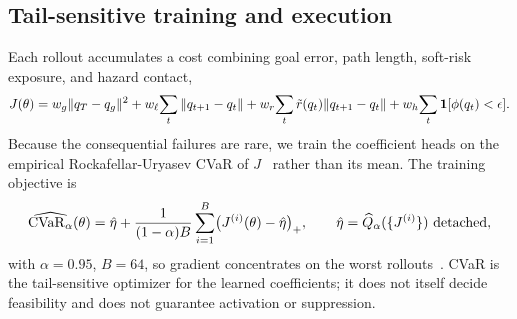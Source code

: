 
\subsection{Tail-sensitive training and execution}
\label{sec:method:cvar}

Each rollout accumulates a cost combining goal error, path length, soft-risk exposure, and hazard contact,
\begin{equation}
J(\theta) =
w_g\|q_T-q_g\|^2
+ w_\ell\!\sum_t\|q_{t+1}-q_t\|
+ w_r\!\sum_t\tilde r(q_t)\|q_{t+1}-q_t\|
+ w_h\!\sum_t\mathbf{1}[\phi(q_t)<\epsilon].
\label{eq:method:J}
\end{equation}
Because the consequential failures are rare, we train the coefficient heads on the empirical Rockafellar-Uryasev CVaR of $J$~\citep{rockafellar2000optimization} rather than its mean. The training objective is
\begin{equation}
\widehat{\mathrm{CVaR}_{\alpha}}(\theta)
=
\hat\eta
+\frac{1}{(1-\alpha)B}\sum_{i=1}^{B}\bigl(J^{(i)}(\theta)-\hat\eta\bigr)_+,
\qquad
\hat\eta=\widehat Q_\alpha(\{J^{(i)}\})\ \text{detached},
\label{eq:method:cvar_emp}
\end{equation}
with $\alpha=0.95$, $B=64$, so gradient concentrates on the worst rollouts~\citep{hong2014monte}. CVaR is the tail-sensitive optimizer for the learned coefficients; it does not itself decide feasibility and does not guarantee activation or suppression.


